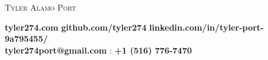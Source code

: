 \documentclass[9pt]{article}
\begin{document}
\begin{center} 
	{\Large \scshape Tyler Alamo Port} 
\end{center}
	\vspace*{-2pt}
\textbf{tyler274.com} \hspace{7.25mm} \faGithub \hspace{0.25mm} \textbf{github.com/tyler274} \hspace{7.25mm} \faLinkedinSquare \hspace{0.25mm} \textbf{linkedin.com/in/tyler-port-9a795455/} \\
\vspace*{3pt}  \hspace{12.25mm} \faEnvelope \hspace{0.1mm} \textbf{tyler274port@gmail.com} \hspace{8.25mm} \faMobile : \textbf{+1 (516) 776-7470}\\
\vspace{1pt}
\smallskip
\end{document}
